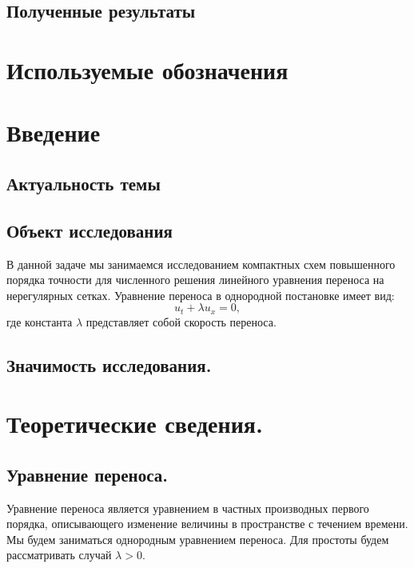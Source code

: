 \documentclass[14pt]{article}
\begin{document}
\subsection*{Полученные результаты}

\newpage
\tableofcontents

\newpage
\section*{Используемые обозначения}

\newpage
\section*{Введение}
\subsection*{Актуальность темы}


\subsection*{Объект исследования}
В данной задаче мы занимаемся исследованием компактных схем повышенного порядка точности для численного решения линейного уравнения переноса на нерегулярных сетках. Уравнение переноса в однородной постановке имеет вид:
\begin{equation}
u_{t} + \lambda u_{x} = 0,
\label{formula1}
\end{equation} 
где константа $\lambda$ представляет собой скорость переноса.


\subsection*{Значимость исследования.}


\newpage
\section{Теоретические сведения.}
\subsection{Уравнение переноса.}
Уравнение переноса является уравнением в частных производных первого порядка, описывающего изменение величины в пространстве с течением времени. Мы будем заниматься однородным уравнением переноса. Для простоты будем рассматривать случай $\lambda>0$.
\end{document}
